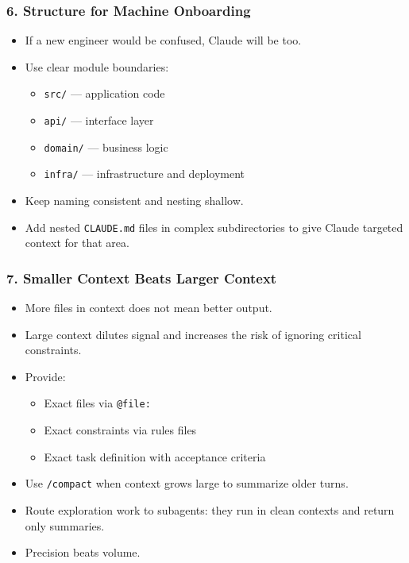 \begin{frame}[fragile]\frametitle{6. Structure for Machine Onboarding}
  \begin{itemize}
    \item If a new engineer would be confused, Claude will be too.
    \item Use clear module boundaries:
    \begin{itemize}
        \item \texttt{src/} --- application code
        \item \texttt{api/} --- interface layer
        \item \texttt{domain/} --- business logic
        \item \texttt{infra/} --- infrastructure and deployment
    \end{itemize}
    \item Keep naming consistent and nesting shallow.
    \item Add nested \texttt{CLAUDE.md} files in complex subdirectories to give Claude targeted context for that area.
  \end{itemize}
\end{frame}

\begin{frame}[fragile]\frametitle{7. Smaller Context Beats Larger Context}
  \begin{itemize}
    \item More files in context does not mean better output.
    \item Large context dilutes signal and increases the risk of ignoring critical constraints.
    \item Provide:
    \begin{itemize}
        \item Exact files via \texttt{@file:}
        \item Exact constraints via rules files
        \item Exact task definition with acceptance criteria
    \end{itemize}
    \item Use \texttt{/compact} when context grows large to summarize older turns.
    \item Route exploration work to subagents: they run in clean contexts and return only summaries.
    \item Precision beats volume.
  \end{itemize}
\end{frame}

